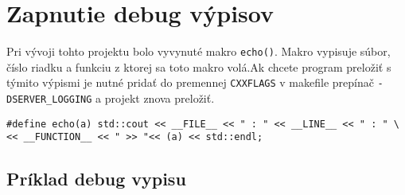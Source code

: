 \documentclass[a4paper, 11pt]{article}
\begin{document}
\section{Zapnutie debug výpisov}
Pri vývoji tohto projektu bolo vyvynuté makro {\tt echo()}. Makro vypisuje súbor, číslo riadku a funkciu z ktorej sa toto makro volá.Ak chcete program preložiť s týmito výpismi je nutné pridať do premennej {\tt CXXFLAGS} v makefile prepínač {\tt -DSERVER\_LOGGING} a projekt znova preložiť. 


\begin{lstlisting}
#define echo(a) std::cout << __FILE__ << " : " << __LINE__ << " : " \
<< __FUNCTION__ << " >> "<< (a) << std::endl;
\end{lstlisting}


	\subsection{Príklad debug vypisu}
	
\end{document}
